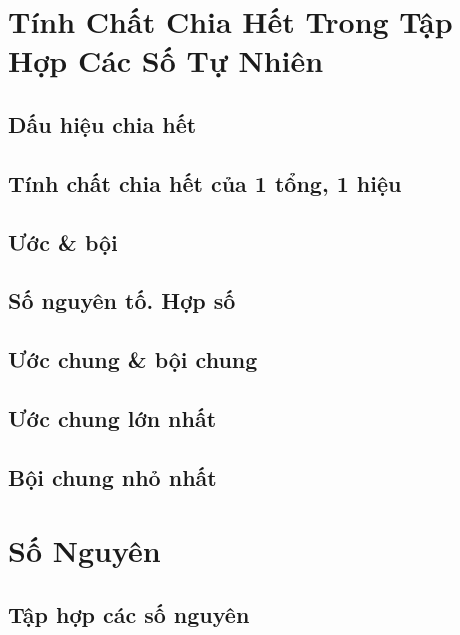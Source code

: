 \documentclass{article}
\numberwithin{equation}{section}
\begin{document}

\section{Tính Chất Chia Hết Trong Tập Hợp Các Số Tự Nhiên}

\subsection{Dấu hiệu chia hết}

\subsection{Tính chất chia hết của 1 tổng, 1 hiệu}

\subsection{Ước \& bội}

\subsection{Số nguyên tố. Hợp số}

\subsection{Ước chung \& bội chung}

\subsection{Ước chung lớn nhất}

\subsection{Bội chung nhỏ nhất}


\section{Số Nguyên}

\subsection{Tập hợp các số nguyên}
\end{document}
